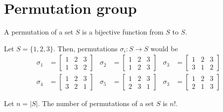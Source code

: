 \section{Permutation group}
    \renewcommand{\leftmark}{April 03, 2024}

    \begin{dfn}
        A permutation of a set \(S\) is a bijective function from \(S\) to \(S\).
    \end{dfn}

    \begin{example}
        Let \(S = \{1, 2, 3\}\). Then, permutations \(\sigma_i : S \to S\) would be \begin{align*}
            \sigma_1 &= \begin{bmatrix}
                1 & 2 & 3 \\ 
                1 & 3 & 2
            \end{bmatrix} &
            \sigma_2 &= \begin{bmatrix}
                1 & 2 & 3 \\
                1 & 2 & 3
            \end{bmatrix}& 
            \sigma_3 &= \begin{bmatrix}
                1 & 2 & 3 \\
                3 & 1 & 2
            \end{bmatrix} \\
            \sigma_4 &= \begin{bmatrix}
                1 & 2 & 3 \\ 
                3 & 2 & 1
            \end{bmatrix} &
            \sigma_5 &= \begin{bmatrix}
                1 & 2 & 3 \\
                2 & 3 & 1
            \end{bmatrix}& 
            \sigma_3 &= \begin{bmatrix}
                1 & 2 & 3 \\
                2 & 1 & 3
            \end{bmatrix}
        \end{align*}
    \end{example}

    \begin{thm}
        Let \(n = |S|\). The number of permutations of a set \(S\) is \(n!\).
    \end{thm}


